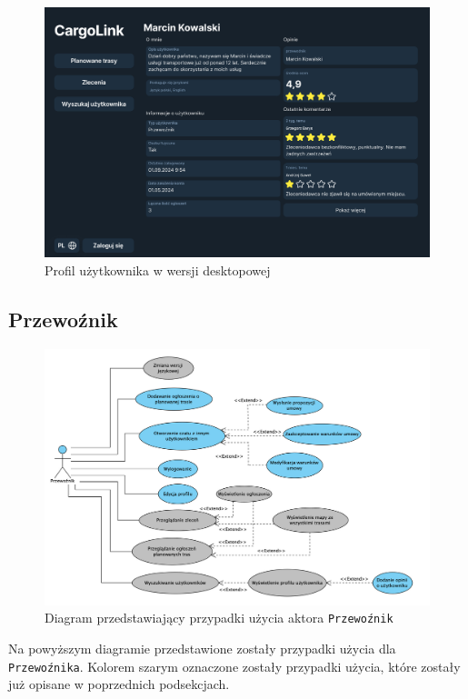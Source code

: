 \begin{figure}[H]
	\centering
		\includegraphics[width=0.7\linewidth]{rozdzial1/profil_d.jpg}
	\caption{Profil użytkownika w wersji desktopowej}
	\label{Rys. fig:Profil użytkownika - desktop}
\end{figure}

\subsection{Przewoźnik}
\begin{figure}[H]
	\centering
		\includegraphics[width=\linewidth]{rozdzial1/PU_przewoznik.jpg}
	\caption{Diagram przedstawiający przypadki użycia aktora \texttt{Przewoźnik}}
	\label{Rys. fig:Diagram przedstawiający przypadki użycia aktora Przewoźnik}
\end{figure}
Na powyższym diagramie przedstawione zostały przypadki użycia dla \texttt{Przewoźnika}. Kolorem szarym oznaczone zostały przypadki użycia, które zostały już opisane w poprzednich podsekcjach.\\

